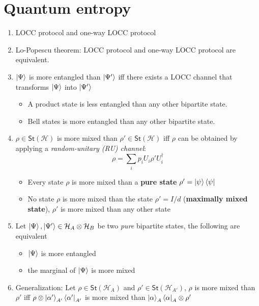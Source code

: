 \documentclass[11pt,a4paper]{article}%
\numberwithin{equation}{section}
\newcommand{\St}{{\mathsf{St}}}
\begin{document}
\section{Quantum entropy} %
\label{sec:quantum_entropy}
\begin{enumerate}
    \item LOCC protocol and one-way LOCC protocol %
    \item Lo-Popescu theorem: LOCC protocol and one-way LOCC protocol are equivalent.
    \item $\ket\Psi$ is more entangled than $\ket{\Psi'}$ iff there exists a LOCC channel that transforms $\ket{\Psi}$ into $\ket{\Psi'}$
    \begin{itemize}
        \item A product state is less entangled than any other bipartite state.
        \item Bell states is more entangled than any other bipartite state.
    \end{itemize}
    \item $\rho\in\St(\mathcal H)$ is more mixed than $\rho'\in\St(\mathcal H)$ iff $\rho$ can be obtained by applying a \emph{random-unitary (RU) channel}:
    \begin{equation}
         \rho = \sum_i p_iU_i\rho' U_i^\dagger
     \end{equation} 
    \begin{itemize}
        \item Every state $\rho$ is more mixed than a \textbf{pure state} $\rho' = \ket\psi\bra\psi$
        \item No state $\rho$ is more mixed than the state $\rho' = I/d$ (\textbf{maximally mixed state}), $\rho'$ is more mixed than any other state
    \end{itemize}
    \item Let $\ket\Psi,\ket{\Psi'}\in\mathcal H_A\otimes\mathcal H_B$ be two \emph{pure} bipartite states, the following are equivalent
    \begin{itemize}
        \item $\ket\Psi$ is more entangled
        \item the marginal of $\ket\Psi$ is more mixed
    \end{itemize}
    \item Generalization: Let $\rho\in\St(\mathcal H_A)$ and $\rho'\in\St(\mathcal H_{A'})$, $\rho$ is more mixed than $\rho'$ iff $\rho\otimes\ket{\alpha'}_{A'}\bra{\alpha'}_{A'}$ is more mixed than $\ket{\alpha}_A\bra\alpha_A\otimes\rho'$

\end{enumerate}
\end{document}
